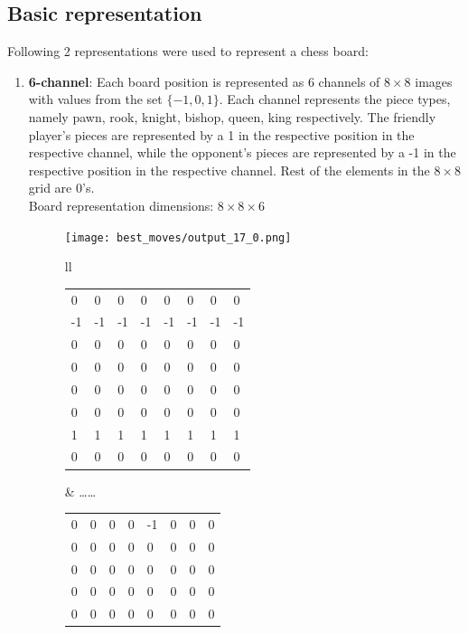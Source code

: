 \subsection{Basic representation}
Following 2 representations were used to represent a chess board:
\begin{enumerate}
\item\textbf{6-channel}: Each board position is represented as 6 channels of 
$8\times 8$ images with values from the set $\{-1,0,1\}$. Each channel 
represents the piece types, namely pawn, rook, knight, bishop, queen, king 
respectively. The friendly player's pieces are represented by a 1 in the 
respective position in the respective channel, while the opponent's pieces are 
represented by a -1 in the respective position in the respective channel. Rest 
of the elements in the $8\times 8$ grid are 0's.\\
Board representation dimensions: $8\times 8 \times 6$\\
\begin{figure}[H]
\centering
\texttt{[image: best\_moves/output\_17\_0.png]}
\begin{longtable}[width=\textwidth]{ll}
\small
   \begin{tabular}[width=0.33\textwidth]{|llllllll|}
    \hline
    0  & 0  & 0  & 0  & 0  & 0  & 0  & 0  \\
    -1 & -1 & -1 & -1 & -1 & -1 & -1 & -1 \\
    0  & 0  & 0  & 0  & 0  & 0  & 0  & 0  \\
    0  & 0  & 0  & 0  & 0  & 0  & 0  & 0  \\
    0  & 0  & 0  & 0  & 0  & 0  & 0  & 0  \\
    0  & 0  & 0  & 0  & 0  & 0  & 0  & 0  \\
    1  & 1  & 1  & 1  & 1  & 1  & 1  & 1  \\
    0  & 0  & 0  & 0  & 0  & 0  & 0  & 0  \\ \hline
    \end{tabular}
    &
\dots\dots\hspace{0.2cm}
\small
    \begin{tabular}[width=0.33\textwidth]{|llllllll|}
    \hline
    0  & 0  & 0  & 0  & -1  & 0  & 0  & 0  \\
    0  & 0  & 0  & 0  & 0  & 0  & 0  & 0  \\
    0  & 0  & 0  & 0  & 0  & 0  & 0  & 0  \\
    0  & 0  & 0  & 0  & 0  & 0  & 0  & 0  \\
    0  & 0  & 0  & 0  & 0  & 0  & 0  & 0  \\

\end{tabular}
\end{longtable}
\end{figure}
\end{enumerate}
